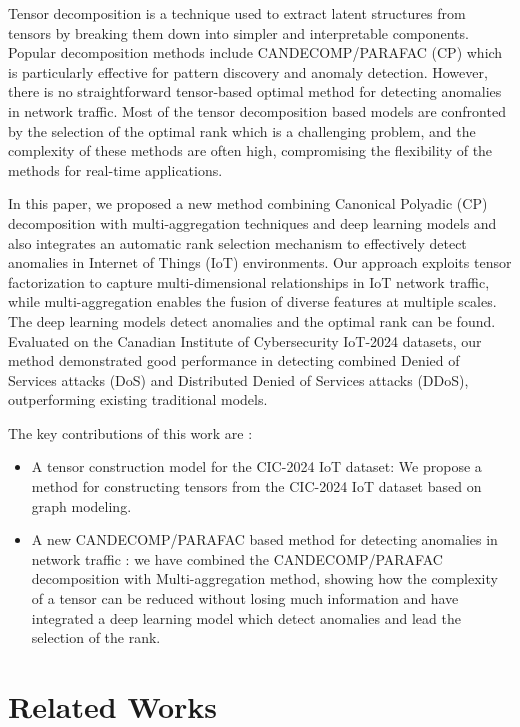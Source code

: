\documentclass{ieeeaccess}
\begin{document}
Tensor decomposition is a technique used to extract latent structures from tensors by breaking them down into simpler and interpretable components. Popular decomposition methods include CANDECOMP/PARAFAC (CP) \cite{kolda2009tensor} which is particularly effective for pattern discovery and anomaly detection.
However, there is no straightforward tensor-based optimal method for detecting anomalies in network traffic. Most of the tensor decomposition based models are confronted by the selection of the optimal rank which is a challenging problem, and the complexity of these methods are often high, compromising the flexibility of the methods for real-time applications.


In this paper, we proposed a new method combining Canonical Polyadic (CP) decomposition with multi-aggregation techniques and deep learning models and also integrates an automatic rank selection mechanism to effectively detect anomalies in Internet of Things (IoT) environments. Our approach exploits tensor factorization to capture multi-dimensional relationships in IoT network traffic, while multi-aggregation enables the fusion of diverse features at multiple scales. The deep learning models detect anomalies and the optimal rank can be found. Evaluated on the Canadian Institute of Cybersecurity IoT-2024 datasets, our method demonstrated good performance in detecting combined Denied of Services attacks (DoS) and Distributed Denied of Services attacks (DDoS), outperforming existing traditional models.

 
The key contributions of this work are :
\begin{itemize}
    \item A tensor construction model for the CIC-2024 IoT dataset: We propose a method for constructing tensors from the CIC-2024 IoT dataset based on graph modeling.
    
    \item A new CANDECOMP/PARAFAC based method for detecting anomalies in network traffic : we have combined the CANDECOMP/PARAFAC decomposition with Multi-aggregation method, showing how the complexity of a tensor can be reduced without losing much information and have integrated a deep learning model which detect anomalies and lead the selection of the rank.

\end{itemize}

\section{Related Works}
\end{document}

